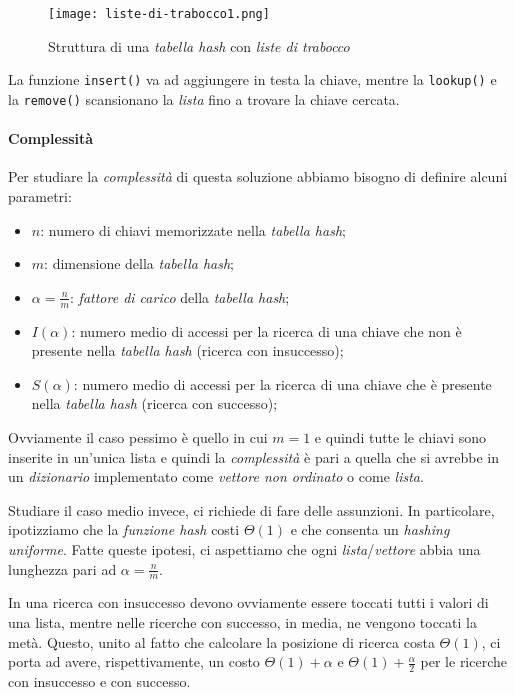 \begin{figure}[h!]
    \centering
    \texttt{[image: liste-di-trabocco1.png]}
    \caption{Struttura di una \emph{tabella hash} con \emph{liste di trabocco}}
\end{figure}\noindent
La funzione \texttt{insert()} va ad aggiungere in testa la chiave, mentre la
\texttt{lookup()} e la \texttt{remove()} scansionano la \emph{lista} fino
a trovare la chiave cercata.

\paragraph{Complessità}
Per studiare la \emph{complessità} di questa soluzione abbiamo bisogno di
definire alcuni parametri:
\begin{itemize}
    \item $n$: numero di chiavi memorizzate nella \emph{tabella hash};
    \item $m$: dimensione della \emph{tabella hash};
    \item $\alpha=\frac{n}{m}$: \emph{fattore di carico} della \emph{tabella hash};
    \item $I(\alpha)$: numero medio di accessi per la ricerca di una chiave che
    non è presente nella \emph{tabella hash} (ricerca con insuccesso);
    \item $S(\alpha)$: numero medio di accessi per la ricerca di una chiave che
    è presente nella \emph{tabella hash} (ricerca con successo);
\end{itemize}\noindent
Ovviamente il caso pessimo è quello in cui $m=1$ e quindi tutte le chiavi sono
inserite in un'unica lista e quindi la \emph{complessità} è pari a quella che
si avrebbe in un \emph{dizionario} implementato come \emph{vettore non ordinato} o
come \emph{lista}.

\bigskip\noindent
Studiare il caso medio invece, ci richiede di fare delle assunzioni. In particolare,
ipotizziamo che la \emph{funzione hash} costi $\Theta(1)$ e che consenta un
\emph{hashing uniforme}. Fatte queste ipotesi, ci aspettiamo che ogni
\emph{lista}/\emph{vettore} abbia una lunghezza pari ad $\alpha=\frac{n}{m}$.

In una ricerca con insuccesso devono ovviamente essere toccati tutti i valori di
una lista, mentre nelle ricerche con successo, in media, ne vengono toccati la
metà. Questo, unito al fatto che calcolare la posizione di ricerca costa
$\Theta(1)$, ci porta ad avere, rispettivamente, un costo $\Theta(1)+\alpha$ e
$\Theta(1)+\frac{\alpha}{2}$ per le ricerche con insuccesso e con successo.

